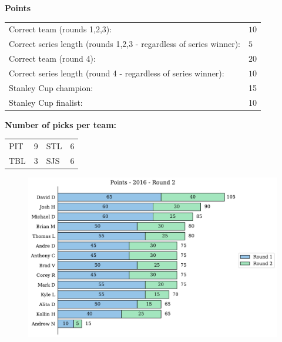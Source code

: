\documentclass[10pt]{article}
\begin{document}
{\bf Points}\\
\begin{minipage}{12cm}
    \begin{tabular}{l l}
        Correct team (rounds 1,2,3):	& $10$\\
        Correct series length (rounds 1,2,3 - regardless of series winner):	& $5$\\
        Correct team (round 4):	& $20$\\
        Correct series length (round 4 - regardless of series winner):	& $10$\\
        Stanley Cup champion:	& 15\\
        Stanley Cup finalist:	& 10\\
    \end{tabular}

    \vspace{1cm}
    {\bf Number of picks per team:}\\
    \begin{tabular}{lc | lc }
        PIT & 9 & STL & 6 \\
        TBL & 3 & SJS & 6 \\
    \end{tabular}
\end{minipage}
\begin{minipage}[t]{13cm}
    \begin{figure}[H]
        \vspace{-2.5cm}
        \includegraphics[width=13cm]{../../figures/2016/Points-2016-Round2.pdf}
    \end{figure}
\end{minipage}
\end{document}
